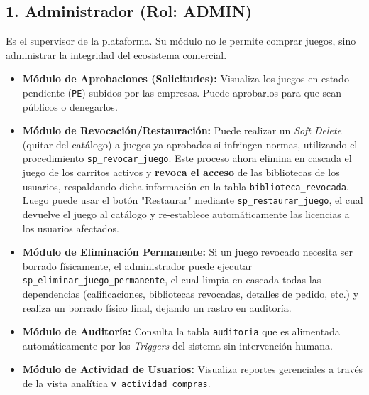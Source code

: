 \documentclass[12pt,a4paper]{article}
\begin{document}
\subsection{1. Administrador (Rol: ADMIN)}
Es el supervisor de la plataforma. Su módulo no le permite comprar juegos, sino administrar la integridad del ecosistema comercial.
\begin{itemize}
    \item \textbf{Módulo de Aprobaciones (Solicitudes):} Visualiza los juegos en estado pendiente (\texttt{PE}) subidos por las empresas. Puede aprobarlos para que sean públicos o denegarlos.
    \item \textbf{Módulo de Revocación/Restauración:} Puede realizar un \textit{Soft Delete} (quitar del catálogo) a juegos ya aprobados si infringen normas, utilizando el procedimiento \texttt{sp\_revocar\_juego}. Este proceso ahora elimina en cascada el juego de los carritos activos y \textbf{revoca el acceso} de las bibliotecas de los usuarios, respaldando dicha información en la tabla \texttt{biblioteca\_revocada}. Luego puede usar el botón "Restaurar" mediante \texttt{sp\_restaurar\_juego}, el cual devuelve el juego al catálogo y re-establece automáticamente las licencias a los usuarios afectados.
    \item \textbf{Módulo de Eliminación Permanente:} Si un juego revocado necesita ser borrado físicamente, el administrador puede ejecutar \texttt{sp\_eliminar\_juego\_permanente}, el cual limpia en cascada todas las dependencias (calificaciones, bibliotecas revocadas, detalles de pedido, etc.) y realiza un borrado físico final, dejando un rastro en auditoría.
    \item \textbf{Módulo de Auditoría:} Consulta la tabla \texttt{auditoria} que es alimentada automáticamente por los \textit{Triggers} del sistema sin intervención humana.
    \item \textbf{Módulo de Actividad de Usuarios:} Visualiza reportes gerenciales a través de la vista analítica \texttt{v\_actividad\_compras}.
\end{itemize}

\end{document}
